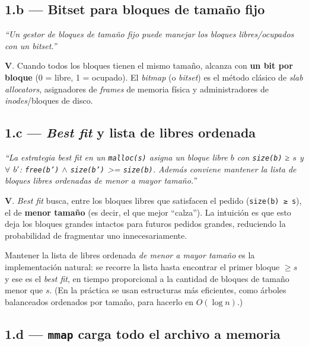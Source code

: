 \documentclass[11pt,a4paper]{article}
\begin{document}
\subsection*{1.b --- Bitset para bloques de tamaño fijo}

\emph{``Un gestor de bloques de tamaño fijo puede manejar los bloques
libres/ocupados con un bitset.''}

\begin{respuesta}
\textbf{V}. Cuando todos los bloques tienen el mismo tamaño, alcanza
con \textbf{un bit por bloque} (0 = libre, 1 = ocupado). El
\emph{bitmap} (o \emph{bitset}) es el método clásico de
\emph{slab allocators}, asignadores de \emph{frames} de memoria
física y administradores de \emph{inodes}/bloques de disco.
\end{respuesta}

\subsection*{1.c --- \emph{Best fit} y lista de libres ordenada}

\emph{``La estrategia \emph{best fit} en un \texttt{malloc(s)} asigna
un bloque libre $b$ con \texttt{size(b)} ≥ $s$ y $∀$ $b'$:
\texttt{free(b')} $∧$ \texttt{size(b')} >= \texttt{size(b)}. Además
conviene mantener la lista de bloques libres ordenadas de menor a
mayor tamaño.''}

\begin{respuesta}
\textbf{V}. \emph{Best fit} busca, entre los bloques libres que
satisfacen el pedido (\texttt{size(b) ≥ s}), el de \textbf{menor
tamaño} (es decir, el que mejor ``calza''). La intuición es que esto
deja los bloques grandes intactos para futuros pedidos grandes,
reduciendo la probabilidad de fragmentar uno innecesariamente.

Mantener la lista de libres ordenada \emph{de menor a mayor tamaño}
es la implementación natural: se recorre la lista hasta encontrar el
primer bloque $\geq s$ y ese es el \emph{best fit}, en tiempo
proporcional a la cantidad de bloques de tamaño menor que $s$. (En la
práctica se usan estructuras más eficientes, como árboles balanceados
ordenados por tamaño, para hacerlo en $O(\log n)$.)
\end{respuesta}

\subsection*{1.d --- \texttt{mmap} carga todo el archivo a memoria}
\end{document}
